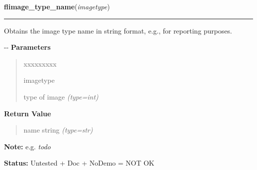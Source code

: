     \label{xformslib:flflimage:flimage_type_name}

    \vspace{0.5ex}

\hspace{.8\funcindent}\begin{boxedminipage}{\funcwidth}

    \raggedright \textbf{flimage\_type\_name}(\textit{imagetype})

    \vspace{-1.5ex}

    \rule{\textwidth}{0.5\fboxrule}
\setlength{\parskip}{2ex}

Obtains the image type name in string format, e.g., for reporting
purposes.

-{}-
\setlength{\parskip}{1ex}
      \textbf{Parameters}
      \vspace{-1ex}

      \begin{quote}
        \begin{Ventry}{xxxxxxxxx}

          \item[imagetype]


type of image
            {\it (type=int)}

        \end{Ventry}

      \end{quote}

      \textbf{Return Value}
    \vspace{-1ex}

      \begin{quote}

name string
      {\it (type=str)}

      \end{quote}

\textbf{Note:} 
e.g. \emph{todo}


\textbf{Status:} 
Untested + Doc + NoDemo = NOT OK


    \end{boxedminipage}

    \label{xformslib:flflimage:flimage_add_text}

    \vspace{0.5ex}

